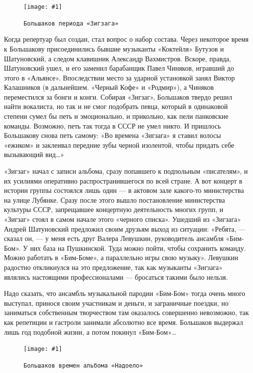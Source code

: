 \documentclass[10pt, twoside]{book}
\newcommand{\myincludegraphics}[1]{\texttt{[image: \#1]}}
\begin{document}
\begin{figure}
    \centering
    \myincludegraphics{Image12}
    \caption{\texttt{Большаков периода «Зигзага»}}
\end{figure}

Когда репертуар был создан, стал вопрос о набор состава. Через некоторое время к Большакову присоединились бывшие
музыканты «Коктейля» Бутузов и Шатуновский, а следом клавишник Александр Вахмистров. Вскоре, правда, Шатуновский ушел, и
его заменил барабанщик Павел Чиняков, игравший до этого в «Альянсе». Впоследствии место за ударной установкой занял
Виктор Калашников (в дальнейшем. «Черный Кофе» и «Родмир»), а Чиняков переместился за бонги и конги. Собирая «Зигзаг»,
Большаков твердо решил найти вокалиста, но так и не смог подобрать певца, который в одинаковой степени сумел бы петь и
эмоционально, и прикольно, как пели панковские команды. Возможно, петь так тогда в СССР не умел никто. И пришлось
Большакову снова петь самому: «Во времена «Зигзага» я ставил волосы «ежиком» и заклеивал передние зубы черной изолентой,
чтобы придать себе вызывающий вид\ldots»

«Зигзаг» начал с записи альбома, сразу попавшего к подпольным «писателям», и их усилиями оперативно распространившегося
по всей стране. А вот концерт в истории группы состоялся лишь один — в актовом зале какого-то министерства на улице
Лубянке. Сразу после этого вышло постановление министерства культуры СССР, запрещавшее концертную деятельность многих
групп, и «Зигзаг» стоял в самом начале этого «черного списка». Ушедший из «Зигзага» Андрей Шатуновский предложил своим
друзьям выход из ситуации: «Ребята, — сказал он, — у меня есть друг Валера Левушкин, руководитель ансамбля «Бим-Бом». У
них база на Пушкинской. Туда можно пойти, чтобы сохранить команду. Можно работать в «Бим-Боме», а параллельно игры свою
музыку». Левушкин радостно откликнулся на это предложение, так как музыканты «Зигзага» являлись настоящими
профессионалами — бросаться такими было нельзя.

Надо сказать, что ансамбль музыкальной пародии «Бим-Бом» тогда очень много выступал, принося своим участникам и деньги,
и заграничные поездки, но заниматься собственным творчеством там оказалось совершенно невозможно, так как репетиции и
гастроли занимали абсолютно все время. Большаков выдержал лишь год подобной жизни, а потом покинул «Бим-Бом»\ldots

\begin{figure}[h]
    \centering
    \myincludegraphics{Image13}
    \caption{\texttt{Большаков времен альбома «Надоело»}}
\end{figure}
\end{document}
